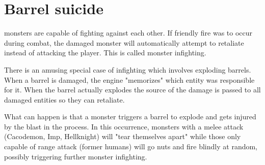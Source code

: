\section{Barrel suicide}
\doom{} monsters are capable of fighting against each other. If friendly fire was to occur during combat, the damaged monster will automatically attempt to retaliate instead of attacking the player. This is called monster infighting.\\
\par
There is an amusing special case of infighting which involves exploding barrels. When a barrel is damaged, the engine "memorizes" which entity was responsible for it. When the barrel actually explodes the source of the damage is passed to all damaged entities so they can retaliate.\\
\par
What can happen is that a monster triggers a barrel to explode and gets injured by the blast in the process. In this occurrence, monsters with a melee attack (Cacodemon, Imp, Hellknight) will "tear themselves apart" while those only capable of range attack (former humans) will go nuts and fire blindly at random, possibly triggering further monster infighting.